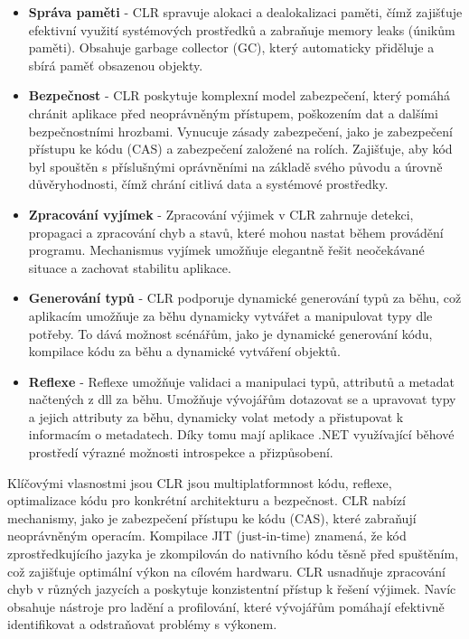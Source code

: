 \begin{itemize}
    \item \textbf{Správa paměti} - CLR spravuje alokaci a dealokalizaci paměti, čímž zajišťuje efektivní využití systémových prostředků a zabraňuje memory leaks (únikům paměti). Obsahuje garbage collector (GC), který automaticky přiděluje a sbírá paměť obsazenou objekty.
    \item \textbf{Bezpečnost} - CLR poskytuje komplexní model zabezpečení, který pomáhá chránit aplikace před neoprávněným přístupem, poškozením dat a dalšími bezpečnostními hrozbami. Vynucuje zásady zabezpečení, jako je zabezpečení přístupu ke kódu (CAS) a zabezpečení založené na rolích. Zajišťuje, aby kód byl spouštěn s příslušnými oprávněními na základě svého původu a úrovně důvěryhodnosti, čímž chrání citlivá data a systémové prostředky.
    \item \textbf{Zpracování vyjímek} - Zpracování výjimek v CLR zahrnuje detekci, propagaci a zpracování chyb a stavů, které mohou nastat během provádění programu. Mechanismus vyjímek umožňuje elegantně řešit neočekávané situace a zachovat stabilitu aplikace.
    \item \textbf{Generování typů} - CLR podporuje dynamické generování typů za běhu, což aplikacím umožňuje za běhu dynamicky vytvářet a manipulovat typy dle potřeby. To dává možnost scénářům, jako je dynamické generování kódu, kompilace kódu za běhu a dynamické vytváření objektů.
    \item \textbf{Reflexe} - Reflexe umožňuje validaci a manipulaci typů, attributů a metadat načtených z dll za běhu. Umožňuje vývojářům dotazovat se a upravovat typy a jejich attributy za běhu, dynamicky volat metody a přistupovat k informacím o metadatech. Díky tomu mají aplikace .NET využívající běhové prostředí výrazné možnosti introspekce a přizpůsobení.
\end{itemize}

Klíčovými vlasnostmi jsou CLR jsou multiplatformnost kódu, reflexe, optimalizace kódu pro konkrétní architekturu a bezpečnost. CLR nabízí mechanismy, jako je zabezpečení přístupu ke kódu (CAS), které zabraňují neoprávněným operacím. Kompilace JIT (just-in-time) znamená, že kód zprostředkujícího jazyka je zkompilován do nativního kódu těsně před spuštěním, což zajišťuje optimální výkon na cílovém hardwaru. CLR usnadňuje zpracování chyb v různých jazycích a poskytuje konzistentní přístup k řešení výjimek. Navíc obsahuje nástroje pro ladění a profilování, které vývojářům pomáhají efektivně identifikovat a odstraňovat problémy s výkonem.


